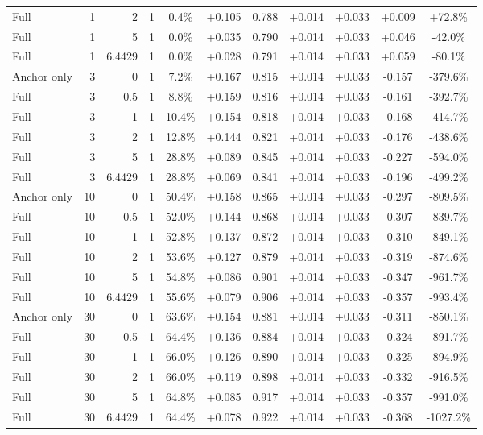 \begin{table}[htbp]
\begin{tabular}{lrrrccccccc}
Full & 1 & 2 & 1 & 0.4\% & +0.105 & 0.788 & +0.014 & +0.033 & +0.009 & +72.8\% \\
Full & 1 & 5 & 1 & 0.0\% & +0.035 & 0.790 & +0.014 & +0.033 & +0.046 & -42.0\% \\
Full & 1 & 6.4429 & 1 & 0.0\% & +0.028 & 0.791 & +0.014 & +0.033 & +0.059 & -80.1\% \\
Anchor only & 3 & 0 & 1 & 7.2\% & +0.167 & 0.815 & +0.014 & +0.033 & -0.157 & -379.6\% \\
Full & 3 & 0.5 & 1 & 8.8\% & +0.159 & 0.816 & +0.014 & +0.033 & -0.161 & -392.7\% \\
Full & 3 & 1 & 1 & 10.4\% & +0.154 & 0.818 & +0.014 & +0.033 & -0.168 & -414.7\% \\
Full & 3 & 2 & 1 & 12.8\% & +0.144 & 0.821 & +0.014 & +0.033 & -0.176 & -438.6\% \\
Full & 3 & 5 & 1 & 28.8\% & +0.089 & 0.845 & +0.014 & +0.033 & -0.227 & -594.0\% \\
Full & 3 & 6.4429 & 1 & 28.8\% & +0.069 & 0.841 & +0.014 & +0.033 & -0.196 & -499.2\% \\
Anchor only & 10 & 0 & 1 & 50.4\% & +0.158 & 0.865 & +0.014 & +0.033 & -0.297 & -809.5\% \\
Full & 10 & 0.5 & 1 & 52.0\% & +0.144 & 0.868 & +0.014 & +0.033 & -0.307 & -839.7\% \\
Full & 10 & 1 & 1 & 52.8\% & +0.137 & 0.872 & +0.014 & +0.033 & -0.310 & -849.1\% \\
Full & 10 & 2 & 1 & 53.6\% & +0.127 & 0.879 & +0.014 & +0.033 & -0.319 & -874.6\% \\
Full & 10 & 5 & 1 & 54.8\% & +0.086 & 0.901 & +0.014 & +0.033 & -0.347 & -961.7\% \\
Full & 10 & 6.4429 & 1 & 55.6\% & +0.079 & 0.906 & +0.014 & +0.033 & -0.357 & -993.4\% \\
Anchor only & 30 & 0 & 1 & 63.6\% & +0.154 & 0.881 & +0.014 & +0.033 & -0.311 & -850.1\% \\
Full & 30 & 0.5 & 1 & 64.4\% & +0.136 & 0.884 & +0.014 & +0.033 & -0.324 & -891.7\% \\
Full & 30 & 1 & 1 & 66.0\% & +0.126 & 0.890 & +0.014 & +0.033 & -0.325 & -894.9\% \\
Full & 30 & 2 & 1 & 66.0\% & +0.119 & 0.898 & +0.014 & +0.033 & -0.332 & -916.5\% \\
Full & 30 & 5 & 1 & 64.8\% & +0.085 & 0.917 & +0.014 & +0.033 & -0.357 & -991.0\% \\
Full & 30 & 6.4429 & 1 & 64.4\% & +0.078 & 0.922 & +0.014 & +0.033 & -0.368 & -1027.2\% \\

\end{tabular}
\end{table}
